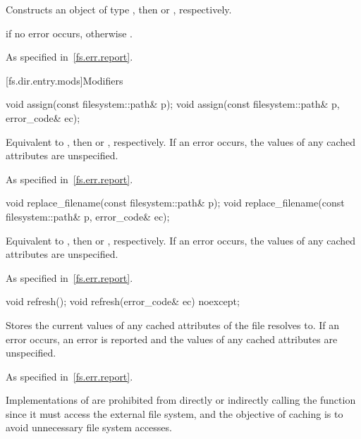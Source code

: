 \begin{itemdescr}
\pnum
\effects Constructs an object of type ,
then  or , respectively.

\pnum
\ensures {} if no error occurs,
otherwise .

\pnum
\throws As specified in~\ref{fs.err.report}.
\end{itemdescr}

[fs.dir.entry.mods]{Modifiers}

%
\begin{itemdecl}
void assign(const filesystem::path& p);
void assign(const filesystem::path& p, error_code& ec);
\end{itemdecl}

\begin{itemdescr}
\pnum
\effects Equivalent to ,
then  or , respectively.
If an error occurs, the values of any cached attributes are unspecified.

\pnum
\throws As specified in~\ref{fs.err.report}.
\end{itemdescr}

%
\begin{itemdecl}
void replace_filename(const filesystem::path& p);
void replace_filename(const filesystem::path& p, error_code& ec);
\end{itemdecl}

\begin{itemdescr}
\pnum
\effects Equivalent to ,
then  or , respectively.
If an error occurs, the values of any cached attributes are unspecified.

\throws As specified in~\ref{fs.err.report}.
\end{itemdescr}

%
\begin{itemdecl}
void refresh();
void refresh(error_code& ec) noexcept;
\end{itemdecl}

\begin{itemdescr}
\pnum
\effects Stores the current values of any cached attributes of the file  resolves to.
If an error occurs, an error is reported
and the values of any cached attributes are unspecified.

\pnum
\throws As specified in~\ref{fs.err.report}.

\pnum
\begin{note}
Implementations of 
are prohibited from directly or indirectly calling the  function
since it must access the external file system,
and the objective of caching is to avoid unnecessary file system accesses.
\end{note}
\end{itemdescr}

